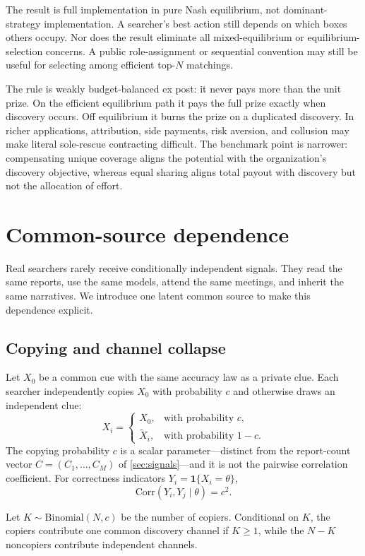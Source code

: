 \documentclass[11pt]{article}
\theoremstyle{definition}
\theoremstyle{remark}
\newcommand{\1}{\mathbf{1}}
\begin{document}
The result is full implementation in pure Nash equilibrium, not dominant-strategy implementation. A searcher's best action still depends on which boxes others occupy. Nor does the result eliminate all mixed-equilibrium or equilibrium-selection concerns. A public role-assignment or sequential convention may still be useful for selecting among efficient top-$N$ matchings.

The rule is weakly budget-balanced ex post: it never pays more than the unit prize. On the efficient equilibrium path it pays the full prize exactly when discovery occurs. Off equilibrium it burns the prize on a duplicated discovery. In richer applications, attribution, side payments, risk aversion, and collusion may make literal sole-rescue contracting difficult. The benchmark point is narrower: compensating unique coverage aligns the potential with the organization's discovery objective, whereas equal sharing aligns total payout with discovery but not the allocation of effort.

\section{Common-source dependence}
\label{sec:copying}

Real searchers rarely receive conditionally independent signals. They read the same reports, use the same models, attend the same meetings, and inherit the same narratives. We introduce one latent common source to make this dependence explicit.

\subsection{Copying and channel collapse}

Let $X_0$ be a common cue with the same accuracy law as a private clue. Each searcher independently copies $X_0$ with probability $c$ and otherwise draws an independent clue:
\[
X_i=
\begin{cases}
X_0, & \text{with probability }c,\\
\widetilde X_i, & \text{with probability }1-c.
\end{cases}
\]
The copying probability $c$ is a scalar parameter---distinct from the report-count vector $C=(C_1,\ldots,C_M)$ of \cref{sec:signals}---and it is not the pairwise correlation coefficient. For correctness indicators $Y_i=\1\{X_i=\theta\}$,
\[
\mathrm{Corr}(Y_i,Y_j\mid\theta)=c^2.
\]

Let $K\sim\mathrm{Binomial}(N,c)$ be the number of copiers. Conditional on $K$, the copiers contribute one common discovery channel if $K\ge1$, while the $N-K$ noncopiers contribute independent channels.
\end{document}
